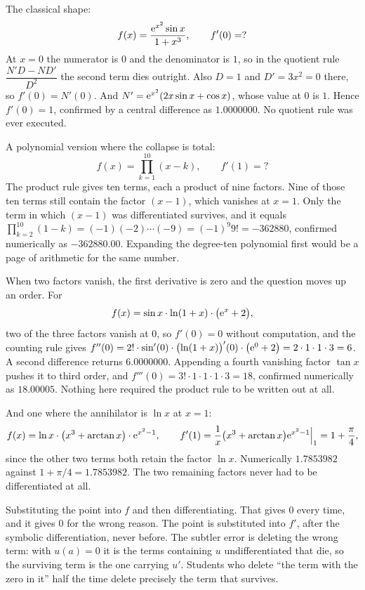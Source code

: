 \begin{worked}
The classical shape:
\[
f(x)=\frac{\mathrm{e}^{x^{2}}\sin x}{1+x^{3}},\qquad f'(0)=?
\]
At $x=0$ the numerator is $0$ and the denominator is $1$, so in the quotient rule $\dfrac{N'D-ND'}{D^{2}}$ the second term dies outright. Also $D=1$ and $D'=3x^{2}=0$ there, so $f'(0)=N'(0)$. And $N'=\mathrm{e}^{x^{2}}(2x\sin x+\cos x)$, whose value at $0$ is $1$. Hence $f'(0)=1$, confirmed by a central difference as $1.0000000$. No quotient rule was ever executed.

A polynomial version where the collapse is total:
\[
f(x)=\prod_{k=1}^{10}(x-k),\qquad f'(1)=?
\]
The product rule gives ten terms, each a product of nine factors. Nine of those ten terms still contain the factor $(x-1)$, which vanishes at $x=1$. Only the term in which $(x-1)$ was differentiated survives, and it equals $\prod_{k=2}^{10}(1-k)=(-1)(-2)\cdots(-9)=(-1)^{9}9!=-362880$, confirmed numerically as $-362880.00$. Expanding the degree-ten polynomial first would be a page of arithmetic for the same number.

When two factors vanish, the first derivative is zero and the question moves up an order. For
\[
f(x)=\sin x\cdot\ln(1+x)\cdot\bigl(\mathrm{e}^{x}+2\bigr),
\]
two of the three factors vanish at $0$, so $f'(0)=0$ without computation, and the counting rule gives $f''(0)=2!\cdot\sin'(0)\cdot\bigl(\ln(1+x)\bigr)'(0)\cdot\bigl(\mathrm{e}^{0}+2\bigr)=2\cdot1\cdot1\cdot3=6$. A second difference returns $6.0000000$. Appending a fourth vanishing factor $\tan x$ pushes it to third order, and $f'''(0)=3!\cdot1\cdot1\cdot1\cdot3=18$, confirmed numerically as $18.00005$. Nothing here required the product rule to be written out at all.

And one where the annihilator is $\ln x$ at $x=1$:
\[
f(x)=\ln x\cdot\bigl(x^{3}+\arctan x\bigr)\cdot\mathrm{e}^{x^{2}-1},\qquad
f'(1)=\frac{1}{x}\bigl(x^{3}+\arctan x\bigr)\mathrm{e}^{x^{2}-1}\Big|_{1}=1+\frac{\pi}{4},
\]
since the other two terms both retain the factor $\ln x$. Numerically $1.7853982$ against $1+\pi/4=1.7853982$. The two remaining factors never had to be differentiated at all.
\end{worked}

\begin{trap}
Substituting the point into $f$ and then differentiating. That gives $0$ every time, and it gives $0$ for the wrong reason. The point is substituted into $f'$, after the symbolic differentiation, never before. The subtler error is deleting the wrong term: with $u(a)=0$ it is the terms containing $u$ undifferentiated that die, so the surviving term is the one carrying $u'$. Students who delete ``the term with the zero in it'' half the time delete precisely the term that survives.
\end{trap}

